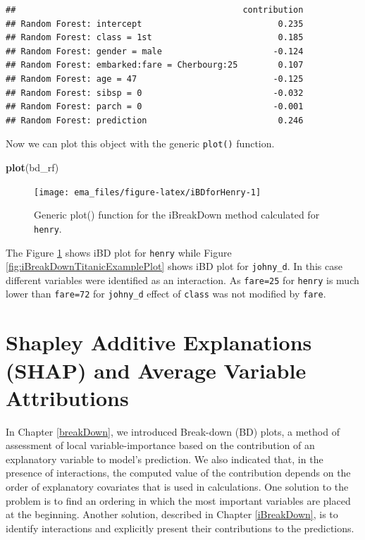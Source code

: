 \documentclass[]{krantz}
\newenvironment{Shaded}{\begin{snugshade}}{\end{snugshade}}
\newcommand{\KeywordTok}[1]{\textcolor[rgb]{0.13,0.29,0.53}{\textbf{#1}}}
\newcommand{\NormalTok}[1]{#1}
\begin{document}
\begin{verbatim}
##                                             contribution
## Random Forest: intercept                           0.235
## Random Forest: class = 1st                         0.185
## Random Forest: gender = male                      -0.124
## Random Forest: embarked:fare = Cherbourg:25        0.107
## Random Forest: age = 47                           -0.125
## Random Forest: sibsp = 0                          -0.032
## Random Forest: parch = 0                          -0.001
## Random Forest: prediction                          0.246
\end{verbatim}

Now we can plot this object with the generic \texttt{plot()} function.



\begin{Shaded}
\begin{Highlighting}[]
\KeywordTok{plot}\NormalTok{(bd_rf) }
\end{Highlighting}
\end{Shaded}

\begin{figure}

{\centering \texttt{[image: ema\_files/figure-latex/iBDforHenry-1]} 

}

\caption{Generic plot() function for the iBreakDown method calculated for \texttt{henry}.}\label{fig:iBDforHenry}
\end{figure}

The Figure \ref{fig:iBDforHenry} shows iBD plot for \texttt{henry} while Figure \ref{fig:iBreakDownTitanicExamplePlot} shows iBD plot for \texttt{johny\_d}. In this case different variables were identified as an interaction. As \texttt{fare=25} for \texttt{henry} is much lower than \texttt{fare=72} for \texttt{johny\_d} effect of \texttt{class} was not modified by \texttt{fare}.

\hypertarget{shapley}{%
\chapter{Shapley Additive Explanations (SHAP) and Average Variable Attributions}\label{shapley}}

In Chapter \ref{breakDown}, we introduced Break-down (BD) plots, a method of assessment of local variable-importance based on the contribution of an explanatory variable to model's prediction. We also indicated that, in the presence of interactions, the computed value of the contribution depends on the order of explanatory covariates that is used in calculations. One solution to the problem is to find an ordering in which the most important variables are placed at the beginning. Another solution, described in Chapter \ref{iBreakDown}, is to identify interactions and explicitly present their contributions to the predictions.
\end{document}
